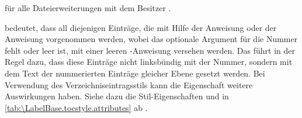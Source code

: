\begin{description}
   für alle Dateierweiterungen mit
  dem Besitzer .
\item[\PValue{numberline}] %
  bedeutet, dass all diejenigen Einträge, die mit Hilfe der Anweisung
   oder der Anweisung
   vorgenommen werden,
  wobei das optionale Argument für die Nummer fehlt oder leer ist, mit einer
  leeren -Anweisung versehen werden. Das
  führt in der Regel dazu, dass diese Einträge nicht linksbündig mit der
  Nummer, sondern mit dem Text der nummerierten Einträge gleicher Ebene
  gesetzt werden. Bei Verwendung des
  Verzeichniseintragsstils  kann die Eigenschaft weitere
  Auswirkungen haben. Siehe dazu die Stil-Eigenschaften
   und  in
  \autoref{tab:\LabelBase.tocstyle.attributes} ab
  .


\end{description}
